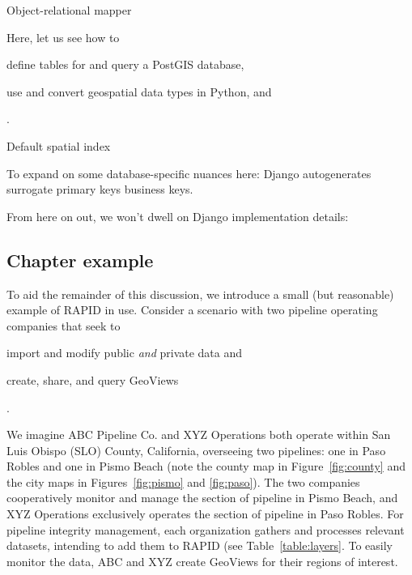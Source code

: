 Object-relational mapper

Here, let us see how to
\begin{enumerate*}[label=\itshape\alph*\upshape)]
\item define tables for and query a PostGIS database,
\item use and convert geospatial data types in Python, and
\end{enumerate*}.

Default spatial index

To expand on some database-specific nuances here: Django autogenerates surrogate primary keys business keys.

From here on out, we won't dwell on Django implementation details: 

\subsection{Chapter example}
To aid the remainder of this discussion, we introduce a small (but reasonable) example of RAPID in use. Consider a scenario with two pipeline operating companies that seek to
\begin{enumerate*}[label=\itshape\alph*\upshape)]
\item import and modify public \textit{and} private data and
\item create, share, and query GeoViews
\end{enumerate*}.

We imagine ABC Pipeline Co. and XYZ Operations both operate within San Luis Obispo (SLO) County, California, overseeing two pipelines: one in Paso Robles and one in Pismo Beach (note the county map in Figure~\ref{fig:county} and the city maps in Figures~\ref{fig:pismo}  and \ref{fig:paso}). The two companies cooperatively monitor and manage the section of pipeline in Pismo Beach, and XYZ Operations exclusively operates the section of pipeline in Paso Robles. For pipeline integrity management, each organization gathers and processes relevant datasets, intending to add them to RAPID (see Table~\ref{table:layers}. To easily monitor the data, ABC and XYZ create GeoViews for their regions of interest.

